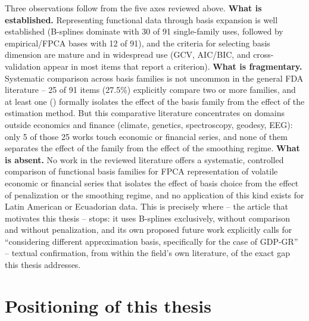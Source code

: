 Three observations follow from the five axes reviewed above.
\textbf{What is established.} Representing functional data through
basis expansion is well established (B-splines dominate with 30 of 91
single-family uses, followed by empirical/FPCA bases with 12 of 91), and
the criteria for selecting basis dimension are mature and in widespread
use (GCV, AIC/BIC, and cross-validation appear in most items that report
a criterion). \textbf{What is fragmentary.} Systematic comparison across
basis families is not uncommon in the general FDA literature -- 25 of 91
items (27.5\%) explicitly compare two or more families, and at least one
(\cite{beyaztas_comparison_2022}) formally isolates the effect of the
basis family from the effect of the estimation method. But this
comparative literature concentrates on domains outside economics and
finance (climate, genetics, spectroscopy, geodesy, EEG): only 5 of those
25 works touch economic or financial series, and none of them separates
the effect of the family from the effect of the smoothing regime.
\textbf{What is absent.} No work in the reviewed literature offers a
systematic, controlled comparison of functional basis families for FPCA
representation of volatile economic or financial series that isolates
the effect of basis choice from the effect of penalization or the
smoothing regime, and no application of this kind exists for Latin
American or Ecuadorian data. This is precisely where \cite{padilla2020}
-- the article that motivates this thesis -- stops: it uses B-splines
exclusively, without comparison and without penalization, and its own
proposed future work explicitly calls for ``considering different
approximation basis, specifically for the case of GDP-GR'' -- textual
confirmation, from within the field's own literature, of the exact gap
this thesis addresses.

\section{Positioning of this thesis}
\label{sec:soa_positioning}

